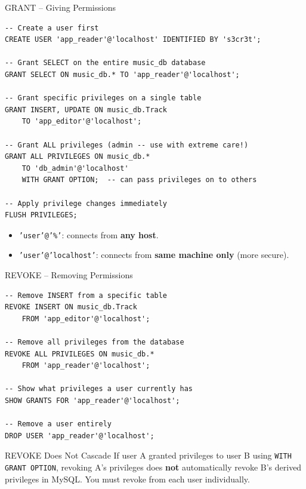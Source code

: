 \begin{frame}[fragile]{GRANT -- Giving Permissions}
  \begin{lstlisting}[style=sqlstyle]
-- Create a user first
CREATE USER 'app_reader'@'localhost' IDENTIFIED BY 's3cr3t';

-- Grant SELECT on the entire music_db database
GRANT SELECT ON music_db.* TO 'app_reader'@'localhost';

-- Grant specific privileges on a single table
GRANT INSERT, UPDATE ON music_db.Track
    TO 'app_editor'@'localhost';

-- Grant ALL privileges (admin -- use with extreme care!)
GRANT ALL PRIVILEGES ON music_db.*
    TO 'db_admin'@'localhost'
    WITH GRANT OPTION;  -- can pass privileges on to others

-- Apply privilege changes immediately
FLUSH PRIVILEGES;
  \end{lstlisting}

  \begin{itemize}
    \item \texttt{'user'@'\%'}: connects from \textbf{any host}.
    \item \texttt{'user'@'localhost'}: connects from \textbf{same machine only} (more secure).
  \end{itemize}
\end{frame}

\begin{frame}[fragile]{REVOKE -- Removing Permissions}
  \begin{lstlisting}[style=sqlstyle]
-- Remove INSERT from a specific table
REVOKE INSERT ON music_db.Track
    FROM 'app_editor'@'localhost';

-- Remove all privileges from the database
REVOKE ALL PRIVILEGES ON music_db.*
    FROM 'app_reader'@'localhost';

-- Show what privileges a user currently has
SHOW GRANTS FOR 'app_reader'@'localhost';

-- Remove a user entirely
DROP USER 'app_reader'@'localhost';
  \end{lstlisting}

  \begin{alertblock}{REVOKE Does Not Cascade}
    If user A granted privileges to user B using \texttt{WITH GRANT OPTION}, revoking
    A's privileges does \textbf{not} automatically revoke B's derived privileges in MySQL.
    You must revoke from each user individually.
  \end{alertblock}
\end{frame}

